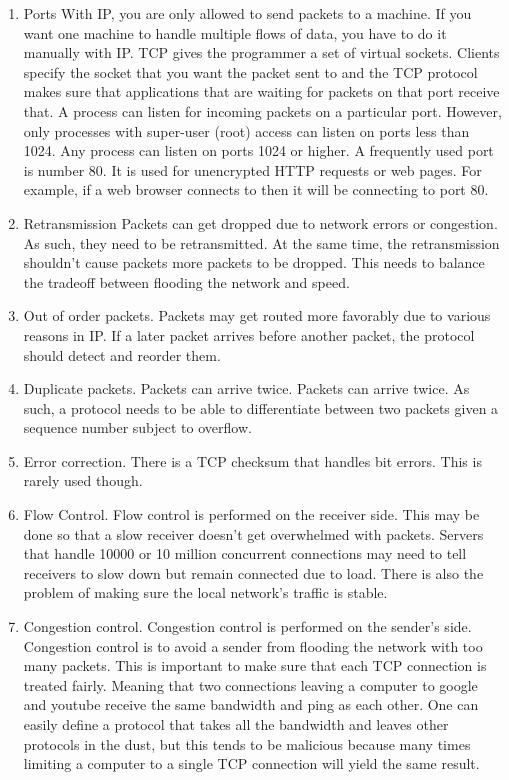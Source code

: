 \begin{enumerate}
  \item \gls{Ports}
  With IP, you are only allowed to send packets to a machine.
  If you want one machine to handle multiple flows of data, you have to do it manually with IP.
  TCP gives the programmer a set of virtual sockets.
  Clients specify the socket that you want the packet sent to and the TCP protocol makes sure that applications that are waiting for packets on that port receive that.
  A process can listen for incoming packets on a particular port.
  However, only processes with \gls{super-user} (root) access can listen on ports less than 1024.
  Any process can listen on ports 1024 or higher.
  A frequently used port is number 80.
  It is used for unencrypted HTTP requests or web pages.
  For example, if a web browser connects to  then it will be connecting to port 80.

\item \gls{Retransmission}
  Packets can get dropped due to network errors or congestion.
  As such, they need to be retransmitted.
  At the same time, the retransmission shouldn't cause packets more packets to be dropped.
  This needs to balance the tradeoff between flooding the network and speed.

\item Out of order packets.
  Packets may get routed more favorably due to various reasons in IP.
  If a later packet arrives before another packet, the protocol should detect and reorder them.

\item Duplicate packets.
  Packets can arrive twice.
  Packets can arrive twice.
  As such, a protocol needs to be able to differentiate between two packets given a sequence number subject to overflow.

\item Error correction.
  There is a TCP checksum that handles bit errors.
  This is rarely used though.

\item Flow Control.
  Flow control is performed on the receiver side.
  This may be done so that a slow receiver doesn't get overwhelmed with packets.
  Servers that handle 10000 or 10 million concurrent connections may need to tell receivers to slow down but remain connected due to load.
  There is also the problem of making sure the local network's traffic is stable.

\item Congestion control.
  Congestion control is performed on the sender's side.
  Congestion control is to avoid a sender from flooding the network with too many packets.
  This is important to make sure that each TCP connection is treated fairly.
  Meaning that two connections leaving a computer to google and youtube receive the same bandwidth and ping as each other.
  One can easily define a protocol that takes all the bandwidth and leaves other protocols in the dust, but this tends to be malicious because many times limiting a computer to a single TCP connection will yield the same result.


\end{enumerate}
